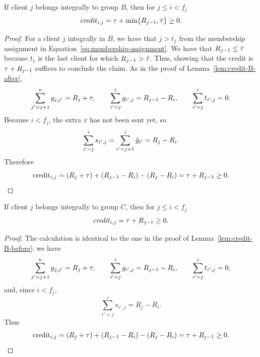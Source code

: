 \begin{lemma}
    \label{lem:credit-B-before}
    If client $j$ belongs integrally to group $B$, then for $j \leq i < f_j$
    \begin{equation*}
        \text{\emph{credit}}_{i,j} = \tau + \min\{R_{j-1},\bar\tau\} \ge 0.
    \end{equation*}
\end{lemma}
\begin{proof}
    For a client $j$ integrally in $B$, we have that $j>t_1$ from the membership assignment in Equation~\ref{eq:membership-assignment}. We have that $R_{j-1} \le \bar\tau$ because $t_1$ is the last client for which $R_{j-1} > \bar\tau$. Thus, showing that the credit is $\tau + R_{j-1}$ suffices to conclude the claim. As in the proof of Lemma~\ref{lem:credit-B-after},
    \begin{equation*}
        \sum_{j'=j+1}^n g_{j,j'} = R_j+\tau,
        \qquad
        \sum_{i'=j}^{i} g_{i',j} = R_{j-1}-R_i,
        \qquad
        \sum_{i'=j}^{i} t_{i',j}=0.
    \end{equation*}
    Because $i<f_j$, the extra $\varepsilon$ has not been sent yet, so
    \begin{equation*}
        \sum_{i'=j}^{i} s_{i',j} = \sum_{i'=j+1}^{i} \hat{g}_{i'} = R_j-R_i.
    \end{equation*}
    Therefore
    \begin{equation*}
        \text{credit}_{i,j} = (R_j+\tau) + (R_{j-1}-R_i) - (R_j-R_i) = \tau + R_{j-1} \ge 0.
    \end{equation*}
\end{proof}

\begin{lemma}
    \label{lem:credit-C-before}
    If client $j$ belongs integrally to group $C$, then for $j \leq i < f_j$
    \begin{equation*}
        \text{\emph{credit}}_{i,j} = \tau + R_{j-1} \ge 0.
    \end{equation*}
\end{lemma}
\begin{proof}
    The calculation is identical to the one in the proof of Lemma~\ref{lem:credit-B-before}: we have
    \begin{equation*}
        \sum_{j'=j+1}^n g_{j,j'} = R_j+\tau,
        \qquad
        \sum_{i'=j}^{i} g_{i',j} = R_{j-1}-R_i,
        \qquad
        \sum_{i'=j}^{i} t_{i',j}=0,
    \end{equation*}
    and, since $i<f_j$,
    \begin{equation*}
        \sum_{i'=j}^{i} s_{i',j} = R_j-R_i.
    \end{equation*}
    Thus
    \begin{equation*}
        \text{credit}_{i,j} = (R_j+\tau) + (R_{j-1}-R_i) - (R_j-R_i) = \tau + R_{j-1} \ge 0.
    \end{equation*}
\end{proof}

